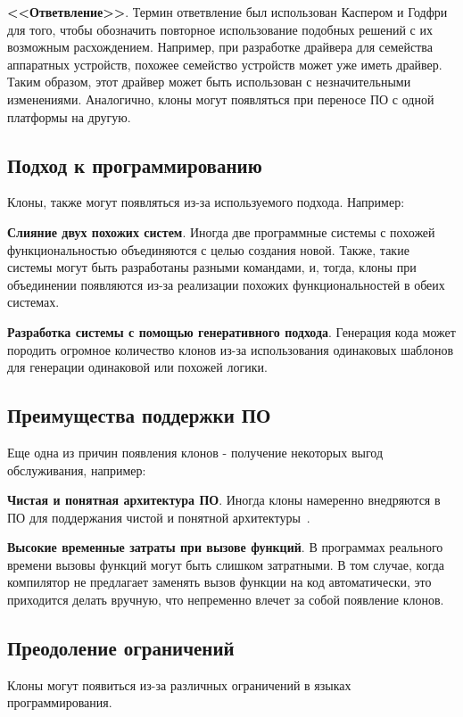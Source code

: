 \textbf{<<Ответвление>>}. Термин ответвление был использован Каспером и Годфри~\cite{forking} для того, чтобы обозначить повторное использование подобных решений с их возможным расхождением. Например, при разработке драйвера для семейства аппаратных устройств, похожее семейство устройств может уже иметь драйвер. Таким образом, этот драйвер может быть использован с незначительными изменениями. Аналогично, клоны могут появляться при переносе ПО с одной платформы на другую. 

\subsection{Подход к программированию}

Клоны, также могут появляться из-за используемого подхода. Например:

\textbf{Слияние двух похожих систем}. Иногда две программные системы с похожей функциональностью объединяются с целью создания новой. Также, такие системы могут быть разработаны разными командами, и, тогда, клоны при объединении появляются из-за реализации похожих функциональностей в обеих системах.

\textbf{Разработка системы с помощью генеративного подхода}. Генерация кода может породить огромное количество клонов из-за использования одинаковых шаблонов для генерации одинаковой или похожей логики.

\subsection{Преимущества поддержки ПО}

Еще одна из причин появления клонов - получение некоторых выгод обслуживания, например:

\textbf{Чистая и понятная архитектура ПО}. Иногда клоны намеренно внедряются в ПО для поддержания чистой и понятной архитектуры~\cite{forking}.

\textbf{Высокие временные затраты при вызове функций}. В программах реального времени вызовы функций могут быть слишком затратными. В том случае, когда компилятор не предлагает заменять вызов функции на код автоматически, это приходится делать вручную, что непременно влечет за собой появление клонов.

\subsection{Преодоление ограничений}

Клоны могут появиться из-за различных ограничений в языках программирования.

